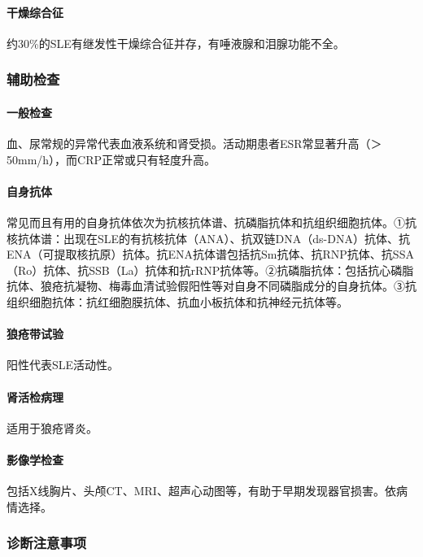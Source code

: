 \paragraph{干燥综合征}

约30\%的SLE有继发性干燥综合征并存，有唾液腺和泪腺功能不全。

\subsubsection{辅助检查}

\paragraph{一般检查}

血、尿常规的异常代表血液系统和肾受损。活动期患者ESR常显著升高（＞
50mm/h），而CRP正常或只有轻度升高。

\paragraph{自身抗体}

常见而且有用的自身抗体依次为抗核抗体谱、抗磷脂抗体和抗组织细胞抗体。①抗核抗体谱：出现在SLE的有抗核抗体（ANA）、抗双链DNA（ds-DNA）抗体、抗ENA（可提取核抗原）抗体。抗ENA抗体谱包括抗Sm抗体、抗RNP抗体、抗SSA（Ro）抗体、抗SSB（La）抗体和抗rRNP抗体等。②抗磷脂抗体：包括抗心磷脂抗体、狼疮抗凝物、梅毒血清试验假阳性等对自身不同磷脂成分的自身抗体。③抗组织细胞抗体：抗红细胞膜抗体、抗血小板抗体和抗神经元抗体等。

\paragraph{狼疮带试验}

阳性代表SLE活动性。

\paragraph{肾活检病理}

适用于狼疮肾炎。

\paragraph{影像学检查}

包括X线胸片、头颅CT、MRI、超声心动图等，有助于早期发现器官损害。依病情选择。

\subsubsection{诊断注意事项}

